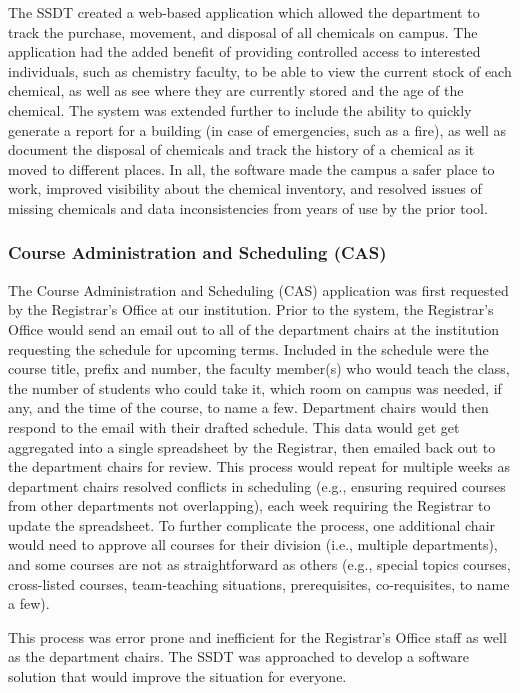 The SSDT created a web-based application which allowed the department to track the purchase, movement, and disposal of all chemicals on campus. The application had the added benefit of providing controlled access to interested individuals, such as chemistry faculty, to be able to view the current stock of each chemical, as well as see where they are currently stored and the age of the chemical. The system was extended further to include the ability to quickly generate a report for a building (in case of emergencies, such as a fire), as well as document the disposal of chemicals and track the history of a chemical as it moved to different places. In all, the software made the campus a safer place to work, improved visibility about the chemical inventory, and resolved issues of missing chemicals and data inconsistencies from years of use by the prior tool.


\subsubsection{Course Administration and Scheduling (CAS)}
The Course Administration and Scheduling (CAS) application was first requested by the Registrar's Office at our institution. Prior to the system, the Registrar's Office would send an email out to all of the department chairs at the institution requesting the schedule for upcoming terms. Included in the schedule were the course title, prefix and number, the faculty member(s) who would teach the class, the number of students who could take it, which room on campus was needed, if any, and the time of the course, to name a few. Department chairs would then respond to the email with their drafted schedule. This data would get get aggregated into a single spreadsheet by the Registrar, then emailed back out to the department chairs for review. This process would repeat for multiple weeks as department chairs resolved conflicts in scheduling (e.g., ensuring required courses from other departments not overlapping), each week requiring the Registrar to update the spreadsheet. To further complicate the process, one additional chair would need to approve all courses for their division (i.e., multiple departments), and some courses are not as straightforward as others (e.g., special topics courses, cross-listed courses, team-teaching situations, prerequisites, co-requisites, to name a few). 

This process was error prone and inefficient for the Registrar's Office staff as well as the department chairs. The SSDT was approached to develop a software solution that would improve the situation for everyone. 


